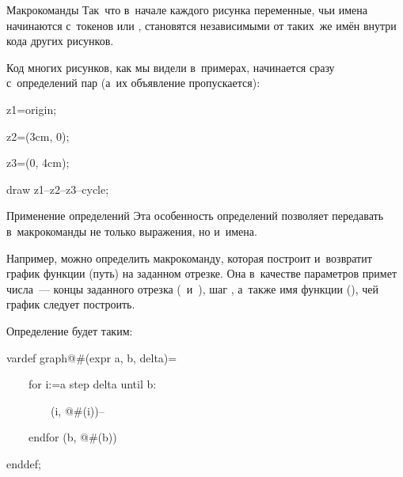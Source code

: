 \begin{frame}{Макрокоманды }
Так~что в~начале каждого рисунка переменные, чьи имена начинаются с~токенов
 или , становятся независимыми от таких~же имён внутри
кода других рисунков.

Код многих рисунков, как мы видели в~примерах, начинается сразу с~определений
пар  (а~их объявление пропускается):
\begin{programlisting}
z1=origin;\par
z2=(3cm, 0);\par
z3=(0, 4cm);\par
\leavevmode\par
draw z1--z2--z3--cycle;\par
\end{programlisting}
\end{frame}

\begin{frame}{Применение определений }
Эта особенность определений  позволяет передавать
в~макрокоманды не только выражения, но и~имена.

Например, можно определить макрокоманду, которая построит и~возвратит график
функции (путь) на заданном отрезке. Она в~качестве параметров примет числа~—
концы заданного отрезка ( и~), шаг ,
а~также имя функции (), чей график следует построить.

Определение будет таким:
\begin{programlisting}
vardef graph@\#(expr a, b, delta)=\par
~~~~for i:=a step delta until b:\par
~~~~~~~~(i, @\#(i))--\par
~~~~endfor (b, @\#(b))\par
enddef;
\end{programlisting}
\end{frame}

